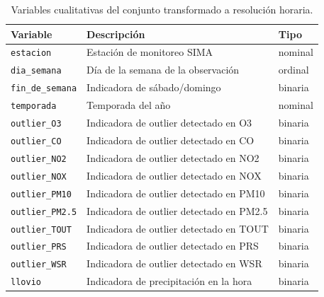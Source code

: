 \begin{table}[t]
  \centering
  \caption{Variables cualitativas del conjunto transformado a resolución
    horaria.}
  \label{tab:dic-horario-cualitativas}
  \small
  \begin{tabular}{lp{4.3cm}l}
    \toprule
    Variable & Descripción & Tipo \\
    \midrule
    \texttt{estacion}       & Estación de monitoreo SIMA                     & nominal \\
    \texttt{dia\_semana}    & Día de la semana de la observación             & ordinal \\
    \texttt{fin\_de\_semana} & Indicadora de sábado/domingo                  & binaria \\
    \texttt{temporada}      & Temporada del año                             & nominal \\
    \texttt{outlier\_O3}    & Indicadora de outlier detectado en O3          & binaria \\
    \texttt{outlier\_CO}    & Indicadora de outlier detectado en CO          & binaria \\
    \texttt{outlier\_NO2}   & Indicadora de outlier detectado en NO2         & binaria \\
    \texttt{outlier\_NOX}   & Indicadora de outlier detectado en NOX         & binaria \\
    \texttt{outlier\_PM10}  & Indicadora de outlier detectado en PM10        & binaria \\
    \texttt{outlier\_PM2.5} & Indicadora de outlier detectado en PM2.5       & binaria \\
    \texttt{outlier\_TOUT}  & Indicadora de outlier detectado en TOUT        & binaria \\
    \texttt{outlier\_PRS}   & Indicadora de outlier detectado en PRS         & binaria \\
    \texttt{outlier\_WSR}   & Indicadora de outlier detectado en WSR         & binaria \\
    \texttt{llovio}         & Indicadora de precipitación en la hora         & binaria \\
    \bottomrule
  \end{tabular}
\end{table}

